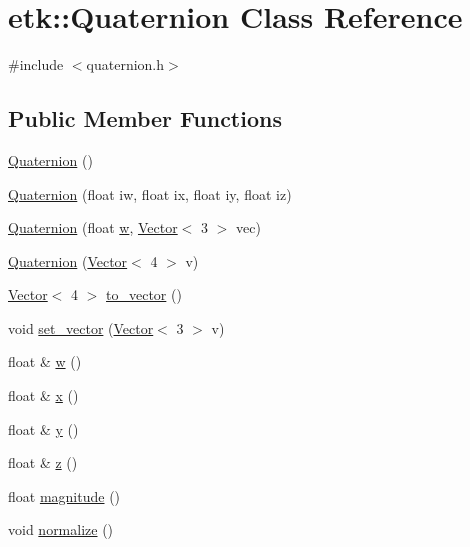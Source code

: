\hypertarget{classetk_1_1_quaternion}{\section{etk\-:\-:Quaternion Class Reference}
\label{classetk_1_1_quaternion}
}


{\ttfamily \#include $<$quaternion.\-h$>$}

\subsection*{Public Member Functions}
\begin{DoxyCompactItemize}
\item 
\hyperlink{classetk_1_1_quaternion_a84e5df2bfc9c0a28324f435bc7e982e9}{Quaternion} ()
\item 
\hyperlink{classetk_1_1_quaternion_ab87d30ca3035f35d0b2398040faa433c}{Quaternion} (float iw, float ix, float iy, float iz)
\item 
\hyperlink{classetk_1_1_quaternion_af9f52e0be9887cf14c9d84c518118812}{Quaternion} (float \hyperlink{classetk_1_1_quaternion_ae8087566ada295e00a13be97a090acc3}{w}, \hyperlink{classetk_1_1_vector}{Vector}$<$ 3 $>$ vec)
\item 
\hyperlink{classetk_1_1_quaternion_a284ec056776c41d681670a76b49eaeac}{Quaternion} (\hyperlink{classetk_1_1_vector}{Vector}$<$ 4 $>$ v)
\item 
\hyperlink{classetk_1_1_vector}{Vector}$<$ 4 $>$ \hyperlink{classetk_1_1_quaternion_a7c1a3035f2cbf11cb30a29bd1516b801}{to\-\_\-vector} ()
\item 
void \hyperlink{classetk_1_1_quaternion_ae39c916d1534200ec39f04b036aeb97c}{set\-\_\-vector} (\hyperlink{classetk_1_1_vector}{Vector}$<$ 3 $>$ v)
\item 
float \& \hyperlink{classetk_1_1_quaternion_ae8087566ada295e00a13be97a090acc3}{w} ()
\item 
float \& \hyperlink{classetk_1_1_quaternion_ad76e562f566d259c2c9f1ec22d31c1b1}{x} ()
\item 
float \& \hyperlink{classetk_1_1_quaternion_a15f04dac1d1b9d0ae20560e8872d09d7}{y} ()
\item 
float \& \hyperlink{classetk_1_1_quaternion_ab0ec0b04e80256bbd09dccd3612b0a74}{z} ()
\item 
float \hyperlink{classetk_1_1_quaternion_a858bc7b7679991c4184f787e90088374}{magnitude} ()
\item 
void \hyperlink{classetk_1_1_quaternion_a2fea07c80f64acf916c4141068d4dc4d}{normalize} ()

\end{DoxyCompactItemize}
